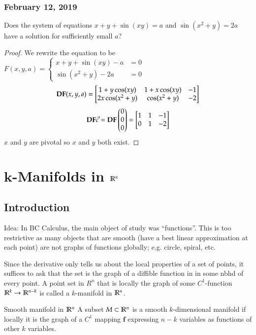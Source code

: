 \subsubsection*{February 12, 2019}

Does the system of equations $x+y+\sin (xy)=a$ and $\sin (x^2+y)=2a$ have a solution for sufficiently small $a$?


\begin{proof}
  We rewrite the equation to be $F(x,y,a)=\begin{cases}
    x+y+\sin(xy)-a &= 0 \\
    \sin(x^2+y)-2a &= 0
  \end{cases}$
  \[\textbf{DF}(x,y,a) = \begin{bmatrix} 1 + y\cos(xy) & 1 + x\cos(xy) & -1 \\ 2x\cos(x^2+y) & \cos(x^2+y) & -2 \end{bmatrix}\]
  \[\textbf{DF}\vec{c} = \textbf{DF}\begin{pmatrix} 0 \\ 0 \\ 0 \end{pmatrix} = \begin{bmatrix} 1 & 1 & -1 \\ 0 & 1 & -2 \end{bmatrix}\]
  $x$ and $y$ are pivotal so $x$ and $y$ both exist.
\end{proof}
\vspace{24pt}

\section{$\bm{k}$-Manifolds in $\mathbb{R}^n$}
\subsection{Introduction}
Idea: In BC Calculus, the main object of study was ``functions''. This is too restrictive as many objects that are smooth (have a best linear approximation at each point) are not graphs of functions globally; e.g. circle, spiral, etc.

Since the derivative only tells us about the local properties of a set of points, it suffices to ask that the set is the graph of a diffible function in in some nbhd of every point. A point set in $R^n$ that is locally the graph of some $C^1$-function $\mathbb{R}^k\to \mathbb{R}^{n-k}$ is called a $k$-manifold in $\mathbb{R}^n$.

\begin{defn}{Smooth manifold in $\mathbb{R}^n$}
A subset $M\subset \mathbb{R}^n$ is a smooth $k$-dimensional manifold if locally it is the graph of a $C^1$ mapping $\bm{f}$ expressing $n-k$ variables as functions of other $k$ variables.
\end{defn}

